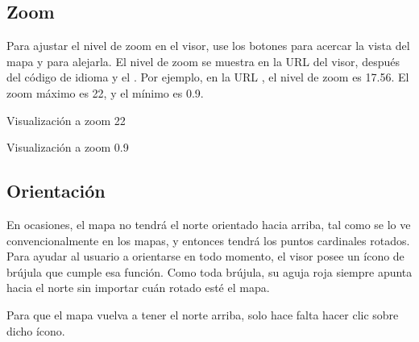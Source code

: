 \documentclass[a4paper,11pt,openany,spanish]{sphinxmanual}
\begin{document}

\sphinxstepscope


\subsection{Zoom}
\label{\detokenize{tools/zoom:zoom}}\label{\detokenize{tools/zoom::doc}}

\sphinxAtStartPar
Para ajustar el nivel de zoom en el visor, use los botones \sphinxstylestrong{+} para acercar la vista del mapa y \sphinxstylestrong{\sphinxhyphen{}} para alejarla. El nivel de zoom se muestra en la URL del visor, después del código de idioma y el \sphinxstylestrong{\#}. Por ejemplo, en la URL , el nivel de zoom es 17.56. El zoom máximo es 22, y el mínimo es 0.9.

\sphinxAtStartPar
Visualización a zoom 22

\noindent{}

\sphinxAtStartPar
Visualización a zoom 0.9

\noindent{}

\sphinxstepscope


\subsection{Orientación}
\label{\detokenize{tools/orientation:orientacion}}\label{\detokenize{tools/orientation::doc}}
\sphinxAtStartPar
En ocasiones, el mapa no tendrá el norte orientado hacia arriba, tal como se lo ve convencionalmente en los mapas, y entonces tendrá los puntos cardinales rotados. Para ayudar al usuario a orientarse en todo momento, el visor posee un ícono de brújula que cumple esa función. Como toda brújula, su aguja roja siempre apunta hacia el norte sin importar cuán rotado esté el mapa.


\sphinxAtStartPar
Para que el mapa vuelva a tener el norte arriba, solo hace falta hacer clic sobre dicho ícono.
\end{document}
